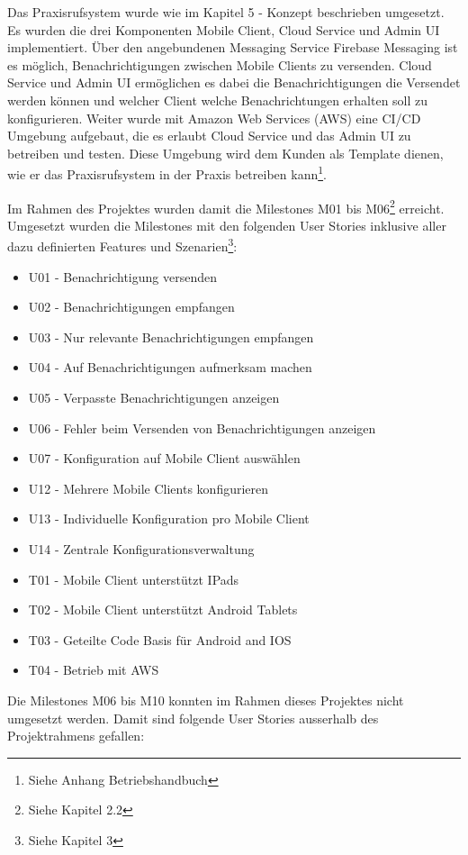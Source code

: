 Das Praxisrufsystem wurde wie im Kapitel 5 - Konzept beschrieben umgesetzt.
Es wurden die drei Komponenten Mobile Client, Cloud Service und Admin UI implementiert.
Über den angebundenen Messaging Service Firebase Messaging ist es möglich, Benachrichtigungen zwischen Mobile Clients zu versenden.
Cloud Service und Admin UI ermöglichen es dabei die Benachrichtigungen die Versendet werden können und welcher Client welche Benachrichtungen erhalten soll zu konfigurieren.
Weiter wurde mit Amazon Web Services (AWS) eine CI/CD Umgebung aufgebaut, die es erlaubt Cloud Service und das Admin UI zu betreiben und testen.
Diese Umgebung wird dem Kunden als Template dienen, wie er das Praxisrufsystem in der Praxis betreiben kann\footnote{Siehe Anhang Betriebshandbuch}.

Im Rahmen des Projektes wurden damit die Milestones M01 bis M06\footnote{Siehe Kapitel 2.2} erreicht.
Umgesetzt wurden die Milestones mit den folgenden User Stories inklusive aller dazu definierten Features und Szenarien\footnote{Siehe Kapitel 3}:

\begin{itemize}
    \item U01 - Benachrichtigung versenden
    \item U02 - Benachrichtigungen empfangen
    \item U03 - Nur relevante Benachrichtigungen empfangen
    \item U04 - Auf Benachrichtigungen aufmerksam machen
    \item U05 - Verpasste Benachrichtigungen anzeigen
    \item U06 - Fehler beim Versenden von Benachrichtigungen anzeigen
    \item U07 - Konfiguration auf Mobile Client auswählen
    \item U12 - Mehrere Mobile Clients konfigurieren
    \item U13 - Individuelle Konfiguration pro Mobile Client
    \item U14 - Zentrale Konfigurationsverwaltung
    \item T01 - Mobile Client unterstützt IPads
    \item T02 - Mobile Client unterstützt Android Tablets
    \item T03 - Geteilte Code Basis für Android and IOS
    \item T04 - Betrieb mit AWS
\end{itemize}

Die Milestones M06 bis M10 konnten im Rahmen dieses Projektes nicht umgesetzt werden.
Damit sind folgende User Stories ausserhalb des Projektrahmens gefallen:

